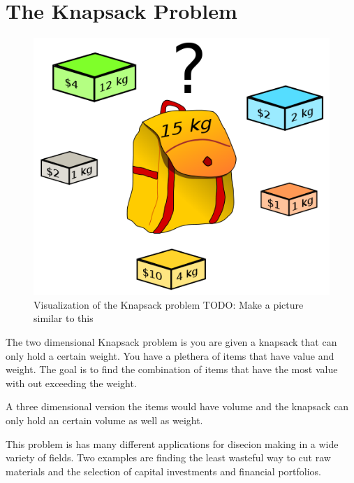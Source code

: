 \label{Ch:Knapsack}


\section*{The Knapsack Problem}


\begin{figure}[H]
\includegraphics[scale = .3]{Knapsack.png}
\caption{Visualization of the Knapsack problem TODO: Make a picture similar to this}
\end{figure}

The two dimensional Knapsack problem is you are given a knapsack that can only hold a certain weight. You have a plethera of items that have value and weight. The goal is to find the combination of items that have the most value with out exceeding the weight.

A three dimensional version the items would have volume and the knapsack can only hold an certain volume as well as weight. 

This problem is has many different applications for disecion making in a wide variety of fields. Two examples are finding the least wasteful way to cut raw materials and the selection of capital investments and financial portfolios.

